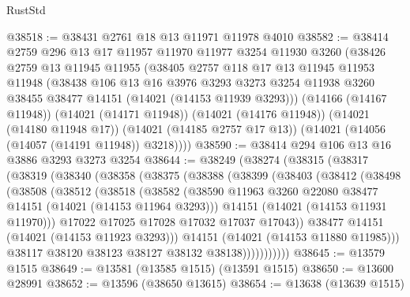 \begin{lexlean}{RustStd}
\begin{coremodule}
@38518 := @38431 @2761 @18 @13 @11971 @11978 @4010
@38582 := @38414
    @2759
    @296
    @13
    @17
    @11957
    @11970
    @11977
    @3254
    @11930
    @3260
    (@38426
      @2759
      @13
      @11945
      @11955
      (@38405
        @2757
        @118
        @17
        @13
        @11945
        @11953
        @11948
        (@38438
          @106
          @13
          @16
          @3976
          @3293
          @3273
          @3254
          @11938
          @3260
          @38455
          @38477
          @14151
          (@14021 (@14153 @11939 @3293)))
        (@14166 (@14167 @11948))
        (@14021 (@14171 @11948))
        (@14021 (@14176 @11948))
        (@14021 (@14180 @11948 @17))
        (@14021 (@14185 @2757 @17 @13))
        (@14021 (@14056 (@14057 (@14191 @11948)) @3218))))
@38590 := @38414 @294 @106 @13 @16 @3886 @3293 @3273 @3254
@38644 := @38249
    (@38274
      (@38315
        (@38317
          (@38319
            (@38340
              (@38358
                (@38375
                  (@38388
                    (@38399
                      (@38403
                        (@38412
                          (@38498
                            (@38508
                              (@38512
                                (@38518
                                  (@38582
                                    (@38590
                                      @11963
                                      @3260
                                      @22080
                                      @38477
                                      @14151
                                      (@14021 (@14153 @11964 @3293)))
                                    @14151
                                    (@14021 (@14153 @11931 @11970)))
                                  @17022
                                  @17025
                                  @17028
                                  @17032
                                  @17037
                                  @17043))
                              @38477
                              @14151
                              (@14021 (@14153 @11923 @3293)))
                            @14151
                            (@14021 (@14153 @11880 @11985)))
                          @38117
                          @38120
                          @38123
                          @38127
                          @38132
                          @38138)))))))))))
@38645 := @13579 @1515
@38649 := @13581 (@13585 @1515) (@13591 @1515)
@38650 := @13600 @28991
@38652 := @13596 (@38650 @13615)
@38654 := @13638 (@13639 @1515)

\end{coremodule}
\end{lexlean}
